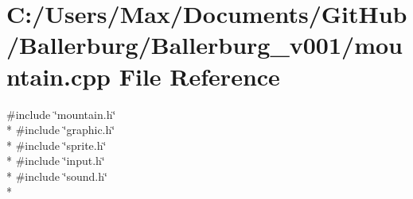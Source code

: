 \section{C\+:/\+Users/\+Max/\+Documents/\+Git\+Hub/\+Ballerburg/\+Ballerburg\+\_\+v001/mountain.cpp File Reference}
\label{mountain_8cpp}
{\ttfamily \#include \char`\"{}mountain.\+h\char`\"{}}\\*
{\ttfamily \#include \char`\"{}graphic.\+h\char`\"{}}\\*
{\ttfamily \#include \char`\"{}sprite.\+h\char`\"{}}\\*
{\ttfamily \#include \char`\"{}input.\+h\char`\"{}}\\*
{\ttfamily \#include \char`\"{}sound.\+h\char`\"{}}\\*
